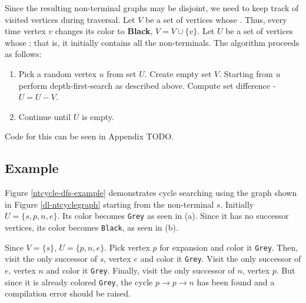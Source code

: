 Since the resulting non-terminal graphs may be disjoint, we need to keep track of visited vertices during traversal. Let $V$ be a set of vertices whose . Thus, every time vertex $v$ changes its color to \textbf{Black}, $V = V \cup \{v\} $. Let $U$ be a set of vertices whose ; that is, it initially contains all the non-terminals. The algorithm proceeds as follows:

\begin{enumerate}
\item
Pick a random vertex $u$ from set $U$. Create empty set $V$. Starting from $u$ perform depth-first-search as described above. Compute set difference - $U = U-V$.
\item
Continue until $U$ is empty.
\end{enumerate}

Code for this can be seen in Appendix TODO.


\subsection{Example}

Figure \ref{ntcycle-dfs-example} demonstrates cycle searching using the graph shown in Figure \ref{dl-ntcyclegraph} starting from the non-terminal $s$. Initially $U=\{s,p,n,e\}$. Its color becomes \texttt{Grey} as seen in (a). Since it has no successor vertices, its color becomes \texttt{Black}, as seen in (b). 

Since $V = \{ s \}$, $U=\{p,n,e\}$. Pick vertex $p$ for expansion and color it \texttt{Grey}. Then, visit the only successor of $s$, vertex $e$ and color it \texttt{Grey}. Visit the only successor of $e$, vertex $n$ and color it \texttt{Grey}. Finally, visit the only successor of $n$, vertex $p$. But since it is already colored \texttt{Grey}, the cycle  $p \rightarrow p \rightarrow n$ has been found and a compilation error should be raised.

